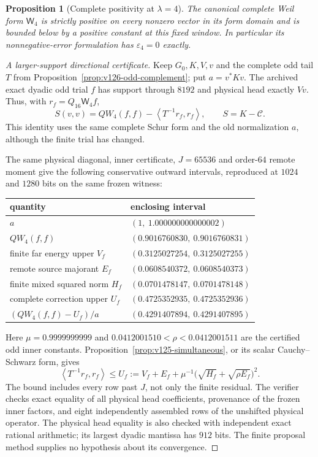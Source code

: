 \documentclass[11pt]{article}
\newtheorem{proposition}[theorem]{Proposition}
\theoremstyle{remark}
\newcommand{\ip}[2]{\left\langle #1,#2\right\rangle}
\begin{document}
\begin{proposition}[Complete positivity at $\lambda=4$]
\label{prop:v126-full-window}
The canonical complete Weil form $\mathsf W_4$ is strictly positive
on every nonzero vector in its form domain and is bounded below
by a positive constant at this fixed window. In particular its
nonnegative-error formulation has $\varepsilon_4=0$ exactly.
\end{proposition}
\begin{proof}[A larger-support directional certificate]
Keep $G_0,K,V,v$ and the complete odd tail $T$ from
Proposition~\ref{prop:v126-odd-complement}; put $a=v^*Kv$.
The archived exact dyadic odd trial $f$ has support through $8192$
and physical head exactly $Vv$. Thus, with $r_f=Q_{16}\mathsf W_4f$,
\[
 S(v,v)=QW_4(f,f)-\ip{T^{-1}r_f}{r_f},\qquad S=K-\mathcal C.
\]
This identity uses the same complete Schur form and the old
normalization $a$, although the finite trial has changed.

The same physical diagonal, inner certificate, $J=65536$ and
order-$64$ remote moment give the following conservative outward
intervals, reproduced at $1024$ and $1280$ bits on the same frozen
witness:
\begin{center}
\begin{tabular}{ll}
\toprule
quantity & enclosing interval\\
\midrule
$a$ & $(1,\ 1.000000000000002)$\\
$QW_4(f,f)$ & $(0.9016760830,\ 0.9016760831)$\\
finite far energy upper $V_f$ & $(0.3125027254,\ 0.3125027255)$\\
remote source majorant $E_f$ & $(0.0608540372,\ 0.0608540373)$\\
finite mixed squared norm $H_f$ & $(0.0701478147,\ 0.0701478148)$\\
complete correction upper $U_f$ & $(0.4725352935,\ 0.4725352936)$\\
$(QW_4(f,f)-U_f)/a$ & $(0.4291407894,\ 0.4291407895)$\\
\bottomrule
\end{tabular}
\end{center}
Here $\mu=0.9999999999$ and
$0.0412001510<\rho<0.0412001511$ are the certified odd inner
constants. Proposition~\ref{prop:v125-simultaneous}, or its scalar
Cauchy--Schwarz form, gives
\[
 \ip{T^{-1}r_f}{r_f}\le U_f
 :=V_f+E_f+\mu^{-1}
          \bigl(\sqrt{H_f}+\sqrt{\rho E_f}\bigr)^2.
\]
The bound includes every row past $J$, not only the finite residual.
The verifier checks exact equality of all physical head coefficients,
provenance of the frozen inner factors, and eight independently
assembled rows of the unshifted physical operator. The physical
head equality is also checked with independent exact rational
arithmetic; its largest dyadic mantissa has $912$ bits. The finite
proposal method supplies no hypothesis about its convergence.


\end{proof}
\end{document}

